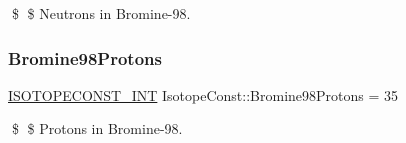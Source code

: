 \$ \$ Neutrons in Bromine-\/98. \mbox{\label{group___isotope_const-_bromine-_br98_gaaf9fbe91420f5a3840a2811de7618825}} 
\subsubsection{\texorpdfstring{Bromine98\+Protons}{Bromine98Protons}}
{\footnotesize\ttfamily \mbox{\hyperlink{group___isotope_const-_macros_ga5f18360b3e99483a35c32d789e62621c}{I\+S\+O\+T\+O\+P\+E\+C\+O\+N\+S\+T\+\_\+\+I\+NT}} Isotope\+Const\+::\+Bromine98\+Protons = 35}

\$ \$ Protons in Bromine-\/98. 